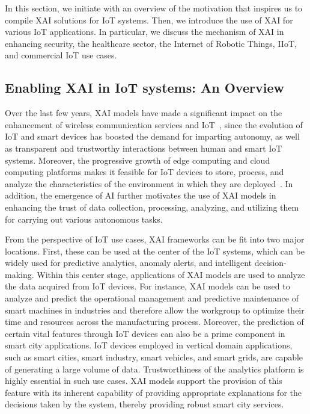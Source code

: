 \documentclass[journal]{IEEEtran}
\begin{document}
In this section, we initiate with an overview of the motivation that inspires us to compile XAI solutions for IoT systems. Then, we introduce the use of XAI for various IoT applications. In particular, we discuss the mechanism of XAI in enhancing security, the healthcare sector, the Internet of Robotic Things, IIoT, and commercial IoT use cases.

\subsection{Enabling XAI in IoT systems: An Overview}

Over the last few years, XAI models have made a significant impact on the enhancement of wireless communication services and IoT~\cite{9536411}, since the evolution of IoT and smart devices has boosted the demand for imparting autonomy, as well as transparent and trustworthy interactions between human and smart IoT systems. Moreover, the progressive growth of edge computing and cloud computing platforms makes it feasible for IoT devices to store, process, and analyze the characteristics of the environment in which they are deployed~\cite{pham2020survey}. In addition, the emergence of AI further motivates the use of XAI models in enhancing the trust of data collection, processing, analyzing, and utilizing them for carrying out various autonomous tasks.

From the perspective of IoT use cases, XAI frameworks can be fit into two major locations. First, these can be used at the center of the IoT systems, which can be widely used for predictive analytics, anomaly alerts, and intelligent decision-making. Within this center stage, applications of XAI models are used to analyze the data acquired from IoT devices. For instance, XAI models can be used to analyze and predict the operational management and predictive maintenance of smart machines in industries and therefore allow the workgroup to optimize their time and resources across the manufacturing process. Moreover, the prediction of certain vital features through IoT devices can also be a prime component in smart city applications. IoT devices employed in vertical domain applications, such as smart cities, smart industry, smart vehicles, and smart grids, are capable of generating a large volume of data. Trustworthiness of the analytics platform is highly essential in such use cases. XAI models support the provision of this feature with its inherent capability of providing appropriate explanations for the decisions taken by the system, thereby providing robust smart city services. 
\end{document}
